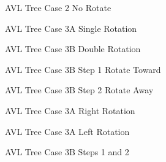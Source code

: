 \documentclass[letterpaper,10pt,english]{sphinxmanual}
\begin{document}
\begin{figure}[htbp]
\centering
\capstart

\noindent{}
\caption{AVL Tree Case 2 \sphinxhyphen{} No Rotate}\label{\detokenize{chap9/chap9:id4}}\end{figure}

\begin{figure}[htbp]
\centering
\capstart

\noindent{}
\caption{AVL Tree Case 3A \sphinxhyphen{} Single Rotation}\label{\detokenize{chap9/chap9:id5}}\end{figure}

\begin{figure}[htbp]
\centering
\capstart

\noindent{}
\caption{AVL Tree Case 3B \sphinxhyphen{} Double Rotation}\label{\detokenize{chap9/chap9:id6}}\end{figure}

\begin{figure}[htbp]
\centering
\capstart

\noindent{}
\caption{AVL Tree Case 3B Step 1 Rotate Toward}\label{\detokenize{chap9/chap9:id7}}\end{figure}

\begin{figure}[htbp]
\centering
\capstart

\noindent{}
\caption{AVL Tree Case 3B Step 2 Rotate Away}\label{\detokenize{chap9/chap9:id8}}\end{figure}

\begin{figure}[htbp]
\centering
\capstart

\noindent{}
\caption{AVL Tree Case 3A Right Rotation}\label{\detokenize{chap9/chap9:id9}}\end{figure}

\begin{figure}[htbp]
\centering
\capstart

\noindent{}
\caption{AVL Tree Case 3A Left Rotation}\label{\detokenize{chap9/chap9:id10}}\end{figure}

\begin{figure}[htbp]
\centering
\capstart

\noindent{}
\caption{AVL Tree Case 3B Steps 1 and 2}\label{\detokenize{chap9/chap9:id11}}\end{figure}
\end{document}
